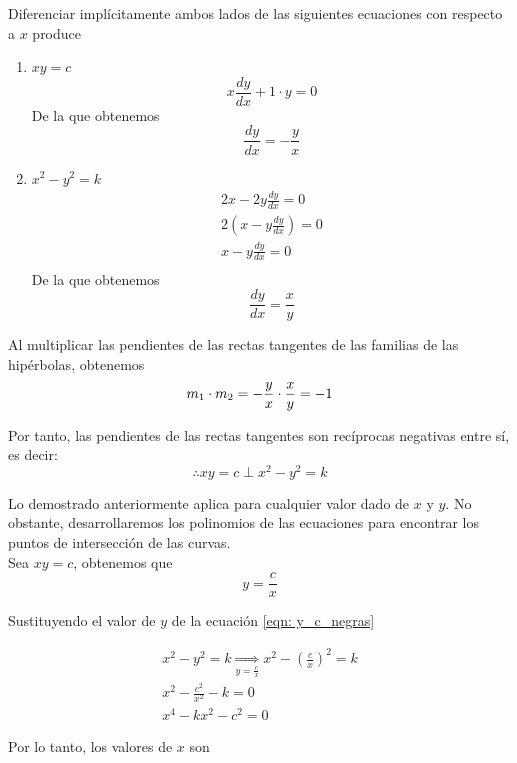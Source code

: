 \documentclass[12pt]{article}
\begin{document}
Diferenciar implícitamente ambos lados de las siguientes ecuaciones con respecto a $x$ produce
\begin{enumerate}
\item $xy=c$
  \[ x\frac{dy}{dx}+1\cdot y=0 \]
  De la que obtenemos
  \begin{equation} \label{eqn: d_c_negras}
    \frac{dy}{dx}=-\frac{y}{x}
  \end{equation}

\item $x^2-y^2=k$
  \begin{align*} 
    2x - 2y\frac{dy}{dx}=0\\
    2(x-y\frac{dy}{dx})=0\\
    x-y\frac{dy}{dx}=0\\
  \end{align*}
  De la que obtenemos
  \begin{equation} \label{eqn: d_c_grises}
    \frac{dy}{dx}=\frac{x}{y}
  \end{equation}
\end{enumerate}

Al multiplicar las pendientes de las rectas tangentes de las familias de las hipérbolas, obtenemos\\
\[
  m_1 \cdot m_2 = -\frac{y}{x}\cdot \frac{x}{y}=-1\\
  \]
  
Por tanto, las pendientes de las rectas tangentes son recíprocas negativas entre sí, es decir:
  \[\therefore xy=c \perp x^2-y^2=k\]

Lo demostrado anteriormente aplica para cualquier valor dado de $x$ y $y$. No obstante, desarrollaremos los polinomios de las ecuaciones para encontrar los puntos de intersección de las curvas.\\

Sea $xy=c$, obtenemos que
\begin{equation} \label{eqn: y_c_negras}
y=\frac{c}{x}
\end{equation}

Sustituyendo el valor de $y$ de la ecuación \eqref{eqn: y_c_negras}

\begin{align*} 
  x^2-y^2=k \underset{y=\frac{c}{x}}{\Longrightarrow} x^2- \left( \frac{c}{x} \right) ^2=k\\
  x^2-\frac{c^2}{x^2}-k=0\\
  x^4-kx^2-c^2=0
\end{align*}

Por lo tanto, los valores de $x$ son
\end{document}
